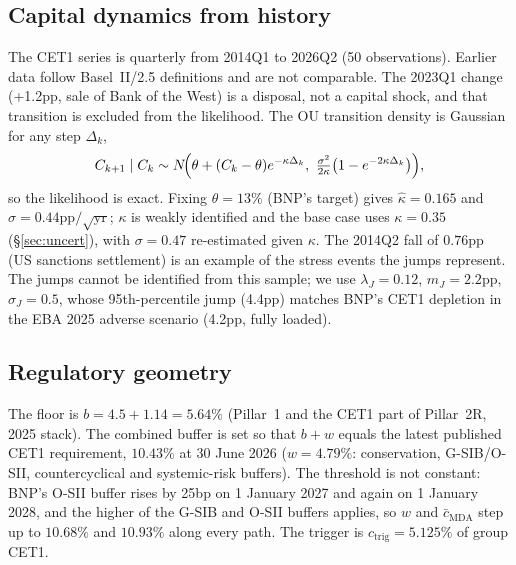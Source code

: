 \documentclass[11pt]{article}
\newcommand{\1}{\mathbf{1}}
\newcommand{\ctrig}{c_{\mathrm{trig}}}
\newcommand{\bmda}{\bar c_{\mathrm{MDA}}}
\begin{document}
\subsection{Capital dynamics from history}
The CET1 series is quarterly from 2014Q1 to 2026Q2 (50 observations). Earlier
data follow Basel~II/2.5 definitions and are not comparable. The 2023Q1 change
(+1.2pp, sale of Bank of the West) is a disposal, not a capital shock, and that
transition is excluded from the likelihood. The OU transition density is
Gaussian for any step $\Delta_k$,
\[
  C_{k+1}\mid C_k \sim N\!\Bigl(\theta+(C_k-\theta)e^{-\kappa\Delta_k},\
  \tfrac{\sigma^2}{2\kappa}\bigl(1-e^{-2\kappa\Delta_k}\bigr)\Bigr),
\]
so the likelihood is exact. Fixing $\theta=13\%$ (BNP's target) gives
$\hat\kappa=0.165$ and $\hat\sigma=0.44$pp$/\sqrt{\text{yr}}$; $\kappa$ is weakly
identified and the base case uses $\kappa=0.35$ (\S\ref{sec:uncert}), with
$\sigma=0.47$ re-estimated given $\kappa$. The 2014Q2 fall of $0.76$pp (US
sanctions settlement) is an example of the stress events the jumps represent. The jumps
cannot be identified from this sample; we use $\lambda_J=0.12$, $m_J=2.2$pp,
$\sigma_J=0.5$, whose 95th-percentile jump (4.4pp) matches BNP's CET1 depletion
in the EBA 2025 adverse scenario (4.2pp, fully loaded).

\subsection{Regulatory geometry}
The floor is $b=4.5+1.14=5.64\%$ (Pillar~1 and the CET1 part of Pillar~2R,
2025 stack). The combined buffer is set so that $b+w$ equals the latest
published CET1 requirement, $10.43\%$ at 30 June 2026 ($w=4.79\%$:
conservation, G-SIB/O-SII, countercyclical and systemic-risk buffers). The
threshold is not constant: BNP's O-SII buffer rises by 25bp on 1 January 2027
and again on 1 January 2028, and the higher of the G-SIB and O-SII buffers
applies, so $w$ and $\bmda$ step up to $10.68\%$ and $10.93\%$ along every path.
The trigger is $\ctrig=5.125\%$ of group CET1.
\end{document}
